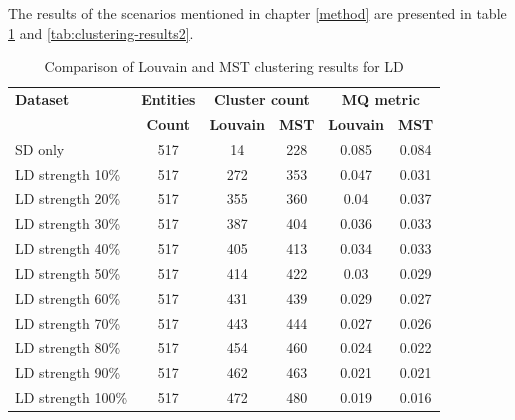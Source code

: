 \documentclass[conference]{IEEEtran}
\begin{document}
The results of the scenarios mentioned in chapter \ref{method} are presented in table \ref{tab:clustering-results1} and \ref{tab:clustering-results2}.

\begin{table}[htbp]
  \centering
  \caption{Comparison of Louvain and MST clustering results for LD}
  \label{tab:clustering-results1}
  \begin{tabular}{lc|cc|cc}
    \toprule
    \textbf{Dataset} & \textbf{Entities} & \multicolumn{2}{c}{\textbf{Cluster count}} & \multicolumn{2}{c}{\textbf{MQ metric}} \\
    & \textbf{Count} & \textbf{Louvain} & \textbf{MST} & \textbf{Louvain} & \textbf{MST} \\
    \midrule
    SD only & 517 & 14 & 228 & 0.085 & 0.084 \\
    LD strength 10\% & 517 & 272 & 353 & 0.047 & 0.031 \\
    LD strength 20\% & 517 & 355 & 360 & 0.04 & 0.037 \\
    LD strength 30\% & 517 & 387 & 404 & 0.036 & 0.033 \\
    LD strength 40\% & 517 & 405 & 413 & 0.034 & 0.033 \\
    LD strength 50\% & 517 & 414 & 422 & 0.03 & 0.029 \\
    LD strength 60\% & 517 & 431 & 439 & 0.029 & 0.027 \\
    LD strength 70\% & 517 & 443 & 444 & 0.027 & 0.026 \\
    LD strength 80\% & 517 & 454 & 460 & 0.024 & 0.022 \\
    LD strength 90\% & 517 & 462 & 463 & 0.021 & 0.021 \\
    LD strength 100\% & 517 & 472 & 480 & 0.019 & 0.016 \\
    \bottomrule
  \end{tabular}
\end{table}
\end{document}
